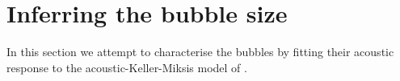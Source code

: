



\section{Inferring the bubble size}

In this section we attempt to characterise the bubbles by fitting their acoustic response to the acoustic-Keller-Miksis model of .



